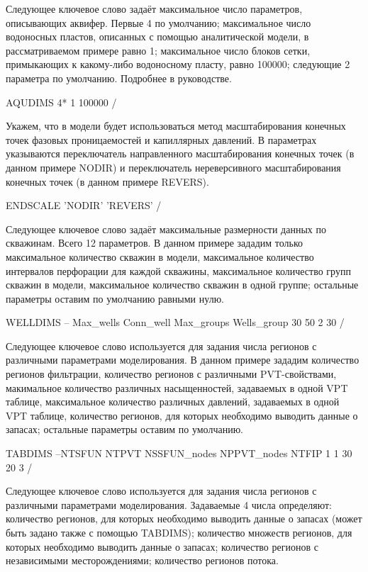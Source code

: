 Следующее ключевое слово задаёт максимальное число параметров, описывающих аквифер.
Первые 4 по умолчанию; максимальное число водоносных пластов, описанных с помощью аналитической модели, в рассматриваемом примере равно 1; максимальное число блоков сетки, примыкающих к какому-либо водоносному пласту, равно 100000; следующие 2 параметра по умолчанию. Подробнее в руководстве.
\begin{eclrun}
AQUDIMS
  4*  1  100000 /
\end{eclrun}

Укажем, что в модели будет использоваться метод масштабирования конечных точек фазовых проницаемостей и капиллярных давлений.
В параметрах указываются переключатель направленного масштабирования конечных точек (в данном примере NODIR) и переключатель нереверсивного масштабирования конечных точек (в данном примере REVERS).
\begin{eclrun}
ENDSCALE
'NODIR'  'REVERS' /
\end{eclrun}

Следующее ключевое слово задаёт максимальные размерности данных по скважинам.
Всего 12 параметров.
В данном примере зададим только максимальное количество скважин в модели, максимальное количество интервалов перфорации для каждой скважины, максимальное количество групп скважин в модели, максимальное количество скважин в одной группе; остальные параметры оставим по умолчанию равными нулю. 
\begin{eclrun}
WELLDIMS
-- Max_wells  Conn_well  Max_groups  Wells_group
   30         50         2           30   /
\end{eclrun}

Следующее ключевое слово используется для задания числа регионов с различными параметрами моделирования.
В данном примере зададим количество регионов фильтрации, количество регионов с различными PVT-свойствами, макимальное количество различных насыщенностей, задаваемых в одной VPT таблице, максимальное количество различных давлений, задаваемых в одной VPT таблице, количество регионов, для которых необходимо выводить данные о запасах; остальные параметры оставим по умолчанию.
\begin{eclrun}
TABDIMS
--NTSFUN  NTPVT  NSSFUN_nodes  NPPVT_nodes NTFIP
    1      1       30           20         3 /
\end{eclrun}

Следующее ключевое слово используется для задания числа регионов с различными параметрами моделирования.
Задаваемые 4 числа определяют:
количество регионов, для которых необходимо выводить данные о запасах (может быть задано также с помощью TABDIMS);
количество множеств регионов, для которых необходимо выводить данные о запасах;
количество регионов с независимыми месторождениями;
количество регионов потока.

